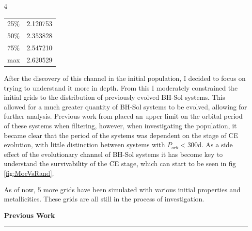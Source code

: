 \documentclass{article}
\begin{document}
\begin{multicols}{4}
\begin{tcolorbox}[sectionbox={Methods}, breakable=true]
\begin{center}
\begin{minipage}[t]{0.3\textwidth}
\begin{tabular}{|l|r|}
            25\% & 2.120753 \\
            50\% & 2.353828 \\
            75\% & 2.547210 \\
            max & 2.620529 \\
          \hline
          \end{tabular}
        \end{minipage}
    \end{center}
    \label{tab:G1_Init_Props}
      After the discovery of this channel in the initial population, I decided to focus on trying to understand it more in depth. From this I moderately constrained the initial grids to the distribution of previously evolved BH-Sol systems. This allowed for a much greater quantity of BH-Sol systems to be evolved, allowing for further analysis. Previous work from \parencite{green_upper_2025} placed an upper limit on the orbital period of these systems when filtering, however, when investigating the population, it became clear that the period of the systems was dependent on the stage of CE evolution, with little distinction between systems with \(P_{orb} < 300\text{d}\). As a side effect of the evolutionary channel of BH-Sol systems it has become key to understand the survivability of the CE stage, which can start to be seen in fig \ref{fig:MoeVsRand}.

      \begin{center}
        \label{fig:MoeVsRand}
      \end{center}

      As of now, 5 more grids have been simulated with various initial properties and metallicities. These grids are all still in the process of investigation. 
        
\end{tcolorbox}

\columnbreak

\begin{tcolorbox}[sectionbox=Previous Results and Current Questions]

  \textbf{Previous Work}
  \vspace{.5cm}
  \hrule
  \vspace{.5cm} 
  

\end{tcolorbox}
\end{multicols}
\end{document}
